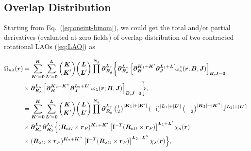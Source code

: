\documentclass[a4paper,11pt,twoside,openright]{book}
\begin{document}
\subsection{Overlap Distribution}
\label{subsec:odist}

Starting from Eq.~(\ref{eq:oneint-binom}), we could get the total and/or partial derivatives (evaluated
at zero fields) of overlap distribution of two contracted rotational LAOs (\ref{eq:LAO}) as

\begin{align}
  \Omega_{\kappa\lambda}(\boldsymbol{r})
  &=\sum_{\boldsymbol{K}'=\boldsymbol{0}}^{\boldsymbol{K}}%
    \sum_{\boldsymbol{L}'=\boldsymbol{0}}^{\boldsymbol{L}}%
    \binom{\boldsymbol{K}}{\boldsymbol{K}'}%
    \binom{\boldsymbol{L}}{\boldsymbol{L}'}%
    \prod^{N_{g}}\boldsymbol{\partial}_{\boldsymbol{R}_{g}}^{\boldsymbol{L}_{g}}%
    \biggl\{\boldsymbol{\partial}_{\boldsymbol{R}_{\kappa}}^{\boldsymbol{L}_{\kappa}}%
      \left[\boldsymbol{\partial}_{\boldsymbol{B}}^{\boldsymbol{K}_{1}+\boldsymbol{K}'}%
        \boldsymbol{\partial}_{\boldsymbol{J}}^{\boldsymbol{L}_{1}+\boldsymbol{L}'}%
        \omega_{\kappa}^\ast(\boldsymbol{r};\boldsymbol{B},%
          \boldsymbol{J})\right]_{\boldsymbol{B},\boldsymbol{J}=\boldsymbol{0}}\\
  &\times\boldsymbol{\partial}_{\boldsymbol{R}_{\lambda}}^{\boldsymbol{L}_{\lambda}}%
      \left[\boldsymbol{\partial}_{\boldsymbol{B}}^{\boldsymbol{K}_{2}+\boldsymbol{K}''}%
        \boldsymbol{\partial}_{\boldsymbol{J}}^{\boldsymbol{L}_{2}+\boldsymbol{L}''}%
        \omega_{\lambda}(\boldsymbol{r};\boldsymbol{B},\boldsymbol{J})\right]_{\boldsymbol{B},\boldsymbol{J}=\boldsymbol{0}}\biggr\},\nonumber\\
%
  &=\sum_{\boldsymbol{K}'=\boldsymbol{0}}^{\boldsymbol{K}}%
    \sum_{\boldsymbol{L}'=\boldsymbol{0}}^{\boldsymbol{L}}
    \binom{\boldsymbol{K}}{\boldsymbol{K}'}%
    \binom{\boldsymbol{L}}{\boldsymbol{L}'}%
    \prod^{N_{g}}\boldsymbol{\partial}_{\boldsymbol{R}_{g}}^{\boldsymbol{L}_{g}}%
    \left(\tfrac{\text{i}}{2}\right)^{|\boldsymbol{K}_{1}|+|\boldsymbol{K}'|}%
    \left(-\text{i}\right)^{|\boldsymbol{L}_{1}|+|\boldsymbol{L}'|}%
    \left(-\tfrac{\text{i}}{2}\right)^{|\boldsymbol{K}_{2}|+|\boldsymbol{K}''|}%
    \text{i}^{|\boldsymbol{L}_{2}|+|\boldsymbol{L}''|}\nonumber\\
  &\times\boldsymbol{\partial}_{\boldsymbol{R}_{\kappa}}^{\boldsymbol{L}_{\kappa}}%
    \boldsymbol{\partial}_{\boldsymbol{R}_{\lambda}}^{\boldsymbol{L}_{\lambda}}%
    \Bigl\{(\boldsymbol{R}_{\kappa G}\times\boldsymbol{r}_{P})^{\boldsymbol{K}_{1}+\boldsymbol{K}'}%
    \left[\mathbf{I}^{-T}(\boldsymbol{R}_{\kappa O}\times\boldsymbol{r}_{P})\right]^{\boldsymbol{L}_{1}+\boldsymbol{L}'}%
    \chi_{\kappa}(\boldsymbol{r})\nonumber\\
  &\times(\boldsymbol{R}_{\lambda G}\times\boldsymbol{r}_{P})^{\boldsymbol{K}_{2}+\boldsymbol{K}''}%
    \left[\mathbf{I}^{-T}(\boldsymbol{R}_{\lambda O}\times\boldsymbol{r}_{P})\right]^{\boldsymbol{L}_{2}+\boldsymbol{L}''}%
    \chi_{\lambda}(\boldsymbol{r})\Bigr\},\nonumber
\end{align}
\end{document}
